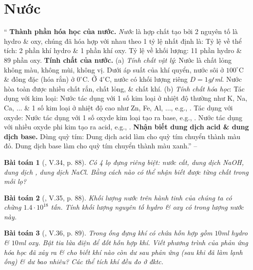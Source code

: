 \documentclass{article}
\newtheorem{baitoan}{Bài toán}
\begin{document}
\section{Nước}
`` \textbf{Thành phần hóa học của nước.} \textit{Nước} là hợp chất tạo bởi 2 nguyên tố là hydro \& oxy, chúng đã hóa hợp với nhau theo 1 tỷ lệ nhất định là: Tỷ lệ về thể tích: 2 phần khí hydro \& 1 phần khí oxy. Tỷ lệ về khối lượng: 11 phần hydro \& 89 phần oxy.  \textbf{Tính chất của nước.} (a) \textit{Tính chất vật lý}: Nước là chất lỏng không màu, không mùi, không vị. Dưới áp suất của khí quyển, nước sôi ở $100^\circ$C \& đông đặc (hóa rắn) ở $0^\circ$C. Ở $4^\circ$C, nước có khối lượng riêng $D = 1$\emph{g\texttt{/}ml}. Nước hòa toàn được nhiều chất rắn, chất lỏng, \& chất khí. (b) \textit{Tính chất hóa học}: Tác dụng với kim loại: Nước tác dụng với 1 số kim loại ở nhiệt độ thường như K, Na, Ca, $\ldots$ \& 1 số kim loại ở nhiệt độ cao như Zn, Fe, Al, $\ldots$, e.g., . Tác dụng với oxyde: Nước tác dụng với 1 số oxyde kim loại tạo ra base, e.g., . Nước tác dụng với nhiều oxyde phi kim tạo ra acid, e.g., .  \textbf{Nhận biết dung dịch acid \& dung dịch base.} Dùng quỳ tím: Dung dịch acid làm cho quỳ tím chuyển thành màu đỏ. Dung dịch base làm cho quỳ tím chuyển thành màu xanh.'' -- \cite[Chap. 5, \S4, pp. 87--88]{Truong_BTNC_Hoa_Hoc_8_2022}

\begin{baitoan}[\cite{Truong_BTNC_Hoa_Hoc_8_2022}, V.34, p. 88]
	Có 4 lọ đựng riêng biệt: nước cất, dung dịch \emph{NaOH}, dung dịch \emph{}, dung dịch \emph{NaCl}. Bằng cách nào có thể nhận biết được từng chất trong mỗi lọ?
\end{baitoan}

\begin{baitoan}[\cite{Truong_BTNC_Hoa_Hoc_8_2022}, V.35, p. 88]
	Khối lượng nước trên hành tinh của chúng ta có chừng $1.4\cdot10^{18}$ tấn. Tính khối lượng nguyên tố hydro \& oxy có trong lượng nước này.
\end{baitoan}

\begin{baitoan}[\cite{Truong_BTNC_Hoa_Hoc_8_2022}, V.36, p. 89]
	Trong ống đựng khí có chứa hỗn hợp gồm $10$\emph{ml} hydro \& $10$\emph{ml} oxy. Bật tia lửa điện để đốt hỗn hợp khí. Viết phương trình của phản ứng hóa học đã xảy ra \& cho biết khí nào còn dư sau phản ứng (sau khi đã làm lạnh ống) \& dư bao nhiêu? Các thể tích khí đều đo ở đktc.
\end{baitoan}
\end{document}
